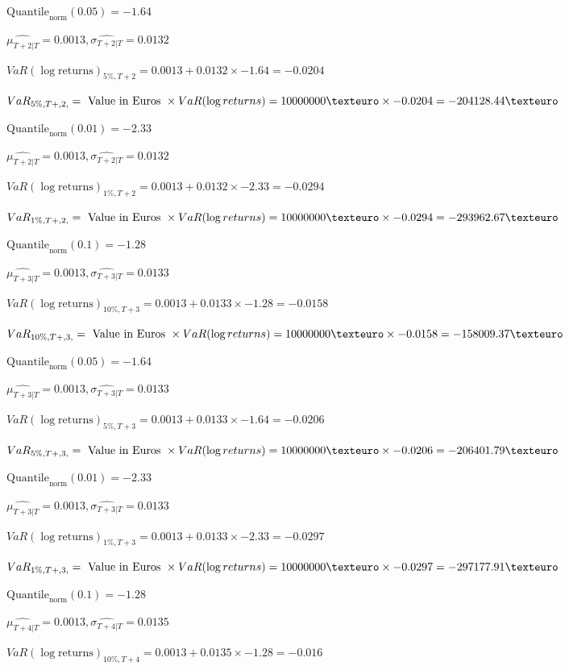 $\text{Quantile}_\text{norm}(0.05) = -1.64$

$\hat{\mu_{T+2|T}} = 0.0013, \hat{\sigma_{T+2|T}} = 0.0132$

$VaR(\log \text{returns})_{5\%, T + 2} = 0.0013 + 0.0132\times-1.64 = -0.0204$

$VaR_{5\%, T + ,2,} = \text{ Value in Euros } \times VaR(\log returns) = 10 000 000 \texteuro \times-0.0204 = -204128.44 \texteuro$


$\text{Quantile}_\text{norm}(0.01) = -2.33$

$\hat{\mu_{T+2|T}} = 0.0013, \hat{\sigma_{T+2|T}} = 0.0132$

$VaR(\log \text{returns})_{1\%, T + 2} = 0.0013 + 0.0132\times-2.33 = -0.0294$

$VaR_{1\%, T + ,2,} = \text{ Value in Euros } \times VaR(\log returns) = 10 000 000 \texteuro \times-0.0294 = -293962.67 \texteuro$


$\text{Quantile}_\text{norm}(0.1) = -1.28$

$\hat{\mu_{T+3|T}} = 0.0013, \hat{\sigma_{T+3|T}} = 0.0133$

$VaR(\log \text{returns})_{10\%, T + 3} = 0.0013 + 0.0133\times-1.28 = -0.0158$

$VaR_{10\%, T + ,3,} = \text{ Value in Euros } \times VaR(\log returns) = 10 000 000 \texteuro \times-0.0158 = -158009.37 \texteuro$


$\text{Quantile}_\text{norm}(0.05) = -1.64$

$\hat{\mu_{T+3|T}} = 0.0013, \hat{\sigma_{T+3|T}} = 0.0133$

$VaR(\log \text{returns})_{5\%, T + 3} = 0.0013 + 0.0133\times-1.64 = -0.0206$

$VaR_{5\%, T + ,3,} = \text{ Value in Euros } \times VaR(\log returns) = 10 000 000 \texteuro \times-0.0206 = -206401.79 \texteuro$


$\text{Quantile}_\text{norm}(0.01) = -2.33$

$\hat{\mu_{T+3|T}} = 0.0013, \hat{\sigma_{T+3|T}} = 0.0133$

$VaR(\log \text{returns})_{1\%, T + 3} = 0.0013 + 0.0133\times-2.33 = -0.0297$

$VaR_{1\%, T + ,3,} = \text{ Value in Euros } \times VaR(\log returns) = 10 000 000 \texteuro \times-0.0297 = -297177.91 \texteuro$


$\text{Quantile}_\text{norm}(0.1) = -1.28$

$\hat{\mu_{T+4|T}} = 0.0013, \hat{\sigma_{T+4|T}} = 0.0135$

$VaR(\log \text{returns})_{10\%, T + 4} = 0.0013 + 0.0135\times-1.28 = -0.016$

